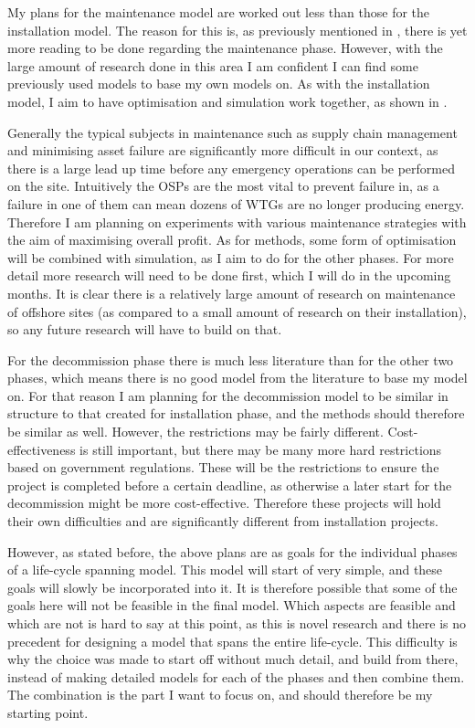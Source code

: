 \documentclass[a4paper,12pt]{article}
\begin{document}
\bigskip

My plans for the maintenance model are worked out less than those for the installation model. The reason for this is, as previously mentioned in , there is yet more reading to be done regarding the maintenance phase. However, with the large amount of research done in this area I am confident I can find some previously used models to base my own models on. As with the installation model, I aim to have optimisation and simulation work together, as shown in .

Generally the typical subjects in maintenance such as supply chain management and minimising asset failure are significantly more difficult in our context, as there is a large lead up time before any emergency operations can be performed on the site. Intuitively the OSPs are the most vital to prevent failure in, as a failure in one of them can mean dozens of WTGs are no longer producing energy. Therefore I am planning on experiments with various maintenance strategies with the aim of maximising overall profit. As for methods, some form of optimisation will be combined with simulation, as I aim to do for the other phases. For more detail more research will need to be done first, which I will do in the upcoming months.  It is clear there is a relatively large amount of research on maintenance of offshore sites (as compared to a small amount of research on their installation), so any future research will have to build on that.

\bigskip

For the decommission phase there is much less literature than for the other two phases, which means there is no good model from the literature to base my model on.
For that reason I am planning for the decommission model to be similar in structure to that created for installation phase, and the methods should therefore be similar as well. However, the restrictions may be fairly different. Cost-effectiveness is still important, but there may be many more hard restrictions based on government regulations. These will be the restrictions to ensure the project is completed before a certain deadline, as otherwise a later start for the decommission might be more cost-effective. Therefore these projects will hold their own difficulties and are significantly different from installation projects. 

\bigskip

However, as stated before, the above plans are as goals for the individual phases of a life-cycle spanning model. This model will start of very simple, and these goals will slowly be incorporated into it. It is therefore possible that some of the goals here will not be feasible in the final model. Which aspects are feasible and which are not is hard to say at this point, as this is novel research and there is no precedent for designing a model that spans the entire life-cycle. This difficulty is why the choice was made to start off without much detail, and build from there, instead of making detailed models for each of the phases and then combine them. The combination is the part I want to focus on, and should therefore be my starting point. 
\end{document}
